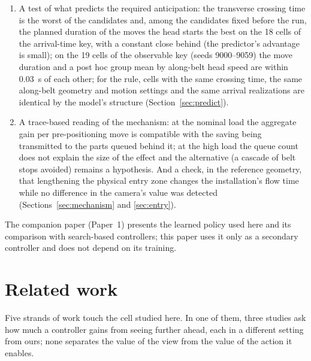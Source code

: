 \documentclass[11pt,a4paper]{article}
\begin{document}
\begin{enumerate}[nosep]
  and a replication on 60 fresh realizations with that key gives 14 cells, a median of
  0.09 and at most 0.47~s per part, and 1 early certification
  (Section~\ref{sec:tiebreak}).
\item A test of what predicts the required anticipation: the transverse crossing time is
  the worst of the candidates and, among the candidates fixed before the run, the planned
  duration of the moves the head starts the best on the 18 cells of the arrival-time key,
  with a constant close behind (the predictor's advantage is small); on the 19 cells of the
  observable key (seeds 9000--9059) the move duration and a post hoc group mean by along-belt head speed are
  within 0.03~s of each other; for the rule, cells with the same crossing time, the same along-belt
  geometry and motion settings and the same arrival realizations are identical by
  the model's structure (Section~\ref{sec:predict}).
\item A trace-based reading of the mechanism: at the nominal load the aggregate gain per
  pre-positioning move is compatible with the saving being transmitted to the parts
  queued behind it; at the high load the queue count does not explain the size of the
  effect and the alternative (a cascade of belt stops avoided) remains a hypothesis. And
  a check, in the reference geometry, that lengthening the physical entry zone changes the
  installation's flow time while no difference in the camera's value was detected (Sections~\ref{sec:mechanism} and \ref{sec:entry}).
\end{enumerate}

The companion paper (Paper~1) presents the learned policy used here and its comparison with
search-based controllers; this paper uses it only as a secondary controller and does not
depend on its training.

\section{Related work}\label{sec:related}
Five strands of work touch the cell studied here. In one of them, three studies ask how
much a controller gains from seeing further ahead, each in a different setting from ours;
none separates the value of the view from the value of the action it enables.
\end{document}
